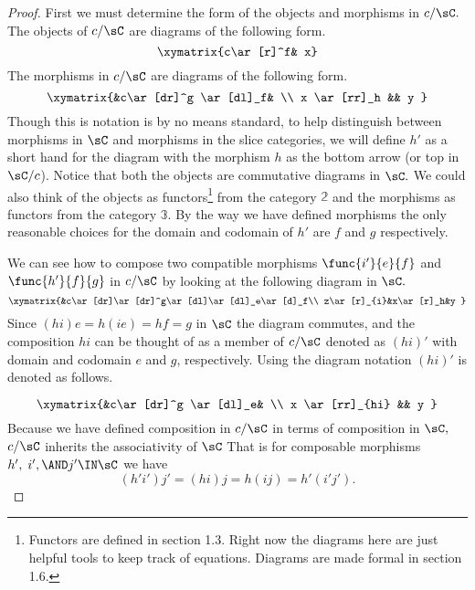 \documentclass[main.tex]{subfiles}
\begin{document}
\begin{proof}
	First we must determine the form of the objects and morphisms in \(c/\sC.\)
	The objects of \(c/\sC\) are diagrams of the following form.
	\[ \xymatrix{c\ar[r]^f& x} \]
	The morphisms in \(c/\sC\) are diagrams of the following form.
	\[ \xymatrix{&c\ar[dr]^g \ar[dl]_f& \\ x \ar[rr]_h && y } \]
	Though this is notation is by no means standard, to help distinguish between
	morphisms in \(\sC\) and morphisms in the slice categories, we will
	define \(h'\) as a short hand for the diagram with the morphism \(h\) as the
	bottom arrow (or top in \(\sC/c\)). Notice that both the objects are
	commutative diagrams in \(\sC.\) We could also think of the objects as
	functors\footnote{Functors are defined in section 1.3. Right now the diagrams here are just helpful tools to keep track of equations. Diagrams are made formal in section 1.6.} from  the category \(\mathbb{2}\) and the morphisms as functors
	from the category \(\mathbb{3}.\) By the way we have defined morphisms the
	only reasonable choices for the domain and codomain of \(h'\) are \(f\) and
	\(g\) respectively.

	We can see how to compose two compatible morphisms \(\func{i'}{e}{f}\) and
	\(\func{h'}{f}{g}\) in \(c/\sC\) by looking at the following diagram in
	\(\sC.\)
	\[ \xymatrix{&c\ar[dr]\ar[dr]^g\ar[dl]\ar[dl]_e\ar[d]_f\\
	z\ar[r]_{i}&x\ar[r]_h&y } \]
	Since \((hi)e=h(ie)=hf=g\) in \(\sC\) the diagram commutes, and the
	composition \(hi\) can be thought of as a member of \(c/\sC\) denoted as
	\((hi)'\) with domain and codomain \(e\) and \(g\), respectively. Using the diagram
	notation \((hi)'\) is denoted as follows.

	\[ \xymatrix{&c\ar[dr]^g \ar[dl]_e& \\ x \ar[rr]_{hi} && y } \]
	Because we have defined composition in \(c/\sC\) in terms of composition
	in \(\sC,\) \(c/\sC\) inherits the associativity of \(\sC\) That
	is for composable morphisms  \(h',\;i',\AND j' \IN \sC\) we have
	\[ (h'i')j'=(hi)j=h(ij)=h'(i'j'). \]


\end{proof}
\end{document}
